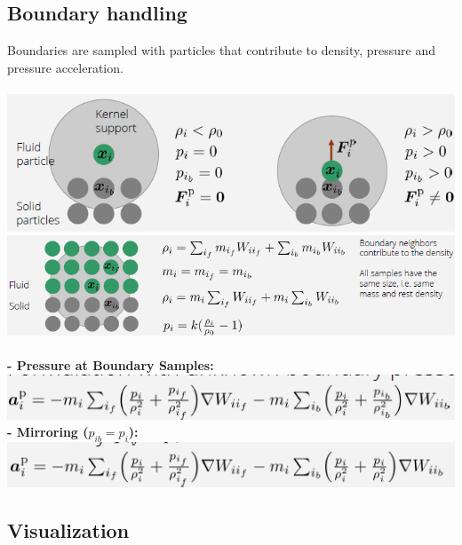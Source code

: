 \documentclass{article}
\begin{document}
\subsection{Boundary handling}
Boundaries are sampled with particles that contribute to density, pressure and pressure acceleration.\\\\
\includegraphics[scale=0.5]{3.png}\\
\includegraphics[scale=0.5]{4.png}\\\\
\textbf{- Pressure at Boundary Samples: }\\
\includegraphics[scale=0.5]{5.png}\\
\textbf{- Mirroring (\textit{$p_{ib}=p_i$}): }\\
\includegraphics[scale=0.5]{6.png}\\
\subsection{Visualization}
\end{document}
